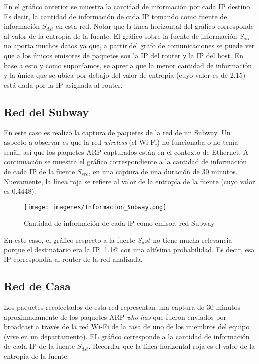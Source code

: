 En el gr\'afico anterior se muestra la cantidad de informaci\'on por cada IP destino. Es decir, la 
cantidad de informaci\'on de cada IP tomando como fuente de informaci\'on $S_{dst}$ en esta red. Notar
que la l\'inea horizontal del gr\'afico corresponde al valor de la entrop\'ia de la fuente.
El gr\'afico sobre la fuente de informaci\'on $S_{src}$ no aporta muchos datos ya que, a partir del 
grafo de comunicaciones se puede ver que a los \'unicos emisores de paquetes son la IP del router y 
la IP del host. En base a esto y como supon\'iamos, se aprecia que la menor cantidad de informaci\'on 
y la \'unica que se ubica por debajo del valor de entrop\'ia (cuyo valor es de 2.15) está dada por 
la IP asignada al router.

\subsection{Red del Subway}

En este caso es realiz\'o la captura de paquetes de la red de un Subway. Un aspecto a observar es
que la red \emph{wireless} (el Wi-Fi) no funcionaba o no ten\'ia sen\~al, as\'i que los paquetes ARP
capturados est\'an en el contexto de Ethernet. A continuaci\'on se muestra el gr\'afico 
correspondiente a la cantidad de informaci\'on de cada IP de la fuente $S_{src}$, en una captura
de una duraci\'on de 30 minutos. Nuevamente, la l\'inea roja se refiere al valor de la entrop\'ia 
de la fuente (cuyo valor es 0.4448).
  
\begin{figure}[htb]
\begin{center}
\texttt{[image: imagenes/Informacion\_Subway.png]}
\caption{Cantidad de informaci\'on de cada IP como emisor, red Subway}
\end{center}
\end{figure}

En este caso, el gr\'afico respecto a la fuente $S_dst$ no tiene mucha relevancia porque el 
destinatario era la IP .1.1@ con una alt\'isima probabilidad. Es decir, esa IP 
correspond\'ia al router de la red analizada. 

\subsection{Red de Casa}

Los paquetes recolectados de esta red representan una captura de 30 minutos aproximadamente de los 
paquetes ARP \emph{who-has} que fueron enviados por broadcast a trav\'es de la red Wi-Fi de la casa 
de uno de los miembros del equipo (vive en un departamento). EL gr\'afico corresponde a la cantidad
de informaci\'on de cada IP de la fuente $S_{dst}$. Recordar que la l\'inea horizontal roja es el
valor de la entrop\'ia de la fuente.

